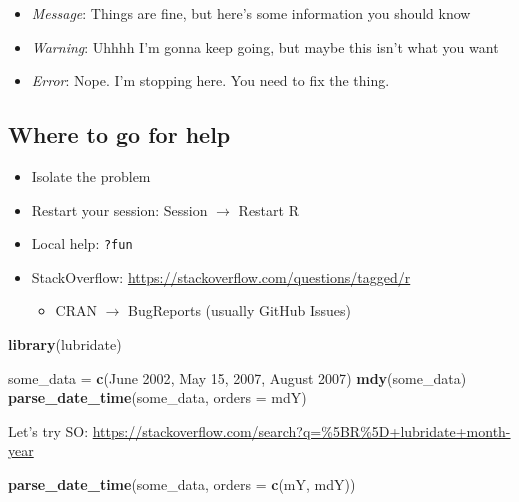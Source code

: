 \documentclass[
]{article}
\newenvironment{Shaded}{\begin{snugshade}}{\end{snugshade}}
\newcommand{\DataTypeTok}[1]{\textcolor[rgb]{0.13,0.29,0.53}{#1}}
\newcommand{\KeywordTok}[1]{\textcolor[rgb]{0.13,0.29,0.53}{\textbf{#1}}}
\newcommand{\NormalTok}[1]{#1}
\newcommand{\StringTok}[1]{\textcolor[rgb]{0.31,0.60,0.02}{#1}}
\providecommand{\tightlist}{%
  \setlength{\itemsep}{0pt}\setlength{\parskip}{0pt}}
\begin{document}
\begin{itemize}
\tightlist
\item
  \emph{Message}: Things are fine, but here's some information you should know
\item
  \emph{Warning}: Uhhhh I'm gonna keep going, but maybe this isn't what you want
\item
  \emph{Error}: Nope. I'm stopping here. You need to fix the thing.
\end{itemize}

\hypertarget{where-to-go-for-help}{%
\subsection{Where to go for help}\label{where-to-go-for-help}}

\begin{itemize}
\tightlist
\item
  Isolate the problem
\item
  Restart your session: Session \(\to\) Restart R
\item
  Local help: \texttt{?fun}
\item
  StackOverflow: \url{https://stackoverflow.com/questions/tagged/r}

  \begin{itemize}
  \tightlist
  \item
    CRAN \(\to\) BugReports (usually GitHub Issues)
  \end{itemize}
\end{itemize}

\begin{Shaded}
\begin{Highlighting}[]
\KeywordTok{library}\NormalTok{(lubridate)}

\NormalTok{some\_data =}\StringTok{ }\KeywordTok{c}\NormalTok{(}\StringTok{\textquotesingle{}June 2002\textquotesingle{}}\NormalTok{, }\StringTok{\textquotesingle{}May 15, 2007\textquotesingle{}}\NormalTok{, }\StringTok{\textquotesingle{}August 2007\textquotesingle{}}\NormalTok{)}
\KeywordTok{mdy}\NormalTok{(some\_data)}
\KeywordTok{parse\_date\_time}\NormalTok{(some\_data, }\DataTypeTok{orders =} \StringTok{\textquotesingle{}mdY\textquotesingle{}}\NormalTok{)}
\end{Highlighting}
\end{Shaded}

Let's try SO: \url{https://stackoverflow.com/search?q=\%5BR\%5D+lubridate+month-year}

\begin{Shaded}
\begin{Highlighting}[]
\KeywordTok{parse\_date\_time}\NormalTok{(some\_data, }\DataTypeTok{orders =} \KeywordTok{c}\NormalTok{(}\StringTok{\textquotesingle{}mY\textquotesingle{}}\NormalTok{, }\StringTok{\textquotesingle{}mdY\textquotesingle{}}\NormalTok{))}
\end{Highlighting}
\end{Shaded}
\end{document}
